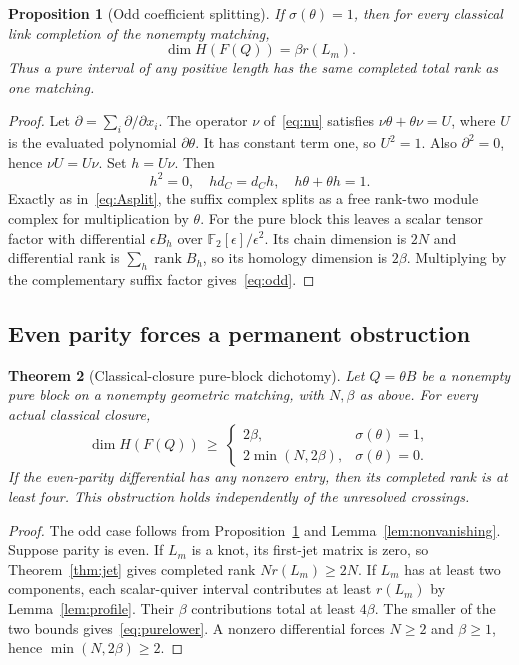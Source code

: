 \documentclass[11pt]{article}
\newtheorem{theorem}{Theorem}[section]
\newtheorem{proposition}[theorem]{Proposition}
\theoremstyle{definition}\newtheorem{definition}[theorem]{Definition}\newtheorem{example}[theorem]{Example}
\theoremstyle{remark}\newtheorem{remark}[theorem]{Remark}
\newcommand{\F}{{\mathbb{F}_2}}
\newcommand{\rk}{\operatorname{rank}}
\begin{document}
\begin{proposition}[Odd coefficient splitting]\label{prop:odd}
If $\sigma(\theta)=1$, then for every classical link completion of the nonempty matching,
\begin{equation}\label{eq:odd}
 \dim H(F(Q))=\beta r(L_m).
\end{equation}
Thus a pure interval of any positive length has the same completed total rank as one matching.
\end{proposition}
\begin{proof}
Let $\partial=\sum_i\partial/\partial x_i$. The operator $\nu$ of~\eqref{eq:nu} satisfies $\nu\theta+\theta\nu=U$, where $U$ is the evaluated polynomial $\partial\theta$. It has constant term one, so $U^2=1$. Also $\partial^2=0$, hence $\nu U=U\nu$. Set $h=U\nu$. Then
\[
 h^2=0,\quad hd_C=d_Ch,\quad h\theta+\theta h=1.
\]
Exactly as in~\eqref{eq:Asplit}, the suffix complex splits as a free rank-two module complex for multiplication by $\theta$. For the pure block this leaves a scalar tensor factor with differential $\epsilon B_h$ over $\F[\epsilon]/\epsilon^2$. Its chain dimension is $2N$ and differential rank is $\sum_h\rk B_h$, so its homology dimension is $2\beta$. Multiplying by the complementary suffix factor gives~\eqref{eq:odd}.
\end{proof}

\subsection{Even parity forces a permanent obstruction}
\begin{theorem}[Classical-closure pure-block dichotomy]\label{thm:parity}
Let $Q=\theta B$ be a nonempty pure block on a nonempty geometric matching, with $N,\beta$ as above. For every actual classical closure,
\begin{equation}\label{eq:purelower}
 \dim H(F(Q))\ \ge\
 \begin{cases}
 2\beta,&\sigma(\theta)=1,\\
 2\min(N,2\beta),&\sigma(\theta)=0.
 \end{cases}
\end{equation}
If the even-parity differential has any nonzero entry, then its completed rank is at least four. This obstruction holds independently of the unresolved crossings.
\end{theorem}
\begin{proof}
The odd case follows from Proposition~\ref{prop:odd} and Lemma~\ref{lem:nonvanishing}. Suppose parity is even. If $L_m$ is a knot, its first-jet matrix is zero, so Theorem~\ref{thm:jet} gives completed rank $N r(L_m)\ge2N$. If $L_m$ has at least two components, each scalar-quiver interval contributes at least $r(L_m)$ by Lemma~\ref{lem:profile}. Their $\beta$ contributions total at least $4\beta$. The smaller of the two bounds gives~\eqref{eq:purelower}. A nonzero differential forces $N\ge2$ and $\beta\ge1$, hence $\min(N,2\beta)\ge2$.
\end{proof}
\end{document}
